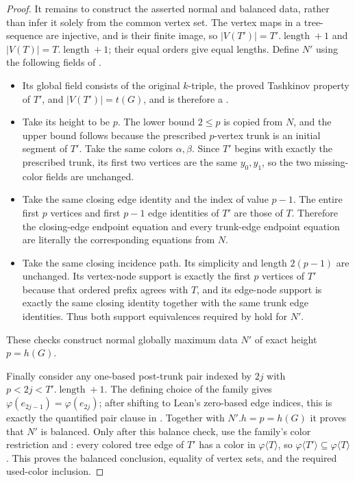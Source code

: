 \begin{proof}
It remains to construct the asserted normal and balanced data, rather
than infer it solely from the common vertex set.  The vertex maps in a
tree-sequence are injective, and  is their
finite image, so
$|V(T')|=T'.\operatorname{length}+1$ and
$|V(T)|=T.\operatorname{length}+1$; their equal orders give equal
lengths.  Define $N'$ using the following fields of
.
\begin{itemize}
\item Its global field consists of the original $k$-triple, the proved
Tashkinov property of $T'$, and $|V(T')|=t(G)$, and is therefore a
.
\item Take its height to be $p$.  The lower bound $2\leq p$ is copied from
$N$, and the upper bound follows because the prescribed $p$-vertex trunk
is an initial segment of $T'$.  Take the same colors $\alpha,\beta$.
Since $T'$ begins with exactly the prescribed trunk, its first two
vertices are the same $y_0,y_1$, so the two missing-color fields are
unchanged.
\item Take the same closing edge identity and the index of value $p-1$.
The entire first $p$ vertices and first $p-1$ edge identities of $T'$ are
those of $T$.  Therefore the closing-edge endpoint equation and every
trunk-edge endpoint equation are literally the corresponding equations
from $N$.
\item Take the same closing incidence path.  Its simplicity and length
$2(p-1)$ are unchanged.  Its vertex-node support is exactly the first
$p$ vertices of $T'$ because that ordered prefix agrees with $T$, and its
edge-node support is exactly the same closing identity together with the
same trunk edge identities.  Thus both support equivalences required by
 hold for $N'$.
\end{itemize}
These checks construct normal globally maximum data $N'$ of exact height
$p=h(G)$.

Finally consider any one-based post-trunk pair indexed by $2j$ with
$p<2j<T'.\operatorname{length}+1$.  The defining choice of the family
gives
$\varphi(e_{2j-1})=\varphi(e_{2j})$; after shifting to Lean's zero-based
edge indices, this is exactly the quantified pair clause in
.  Together with $N'.h=p=h(G)$ it
proves that $N'$ is balanced.  Only after this balance check, use the
family's color restriction and : every colored
tree edge of $T'$ has a color in $\varphi\langle T\rangle$, so
$\varphi\langle T'\rangle\subseteq\varphi\langle T\rangle$.  This proves
the balanced conclusion, equality of vertex sets, and the required
used-color inclusion.
\end{proof}
